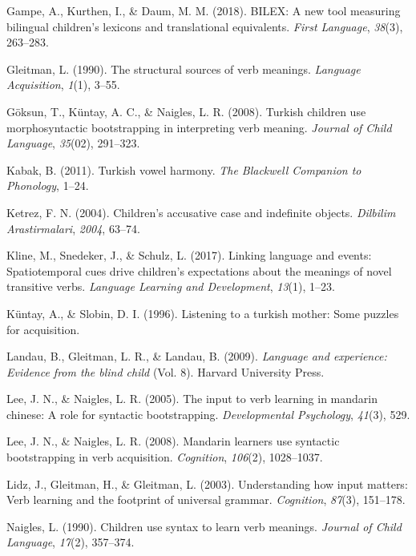 \documentclass[man]{apa6}
\begin{document}
\hypertarget{ref-gampe2018bilex}{}
Gampe, A., Kurthen, I., \& Daum, M. M. (2018). BILEX: A new tool
measuring bilingual children's lexicons and translational equivalents.
\emph{First Language}, \emph{38}(3), 263--283.

\hypertarget{ref-gleitman1990structural}{}
Gleitman, L. (1990). The structural sources of verb meanings.
\emph{Language Acquisition}, \emph{1}(1), 3--55.

\hypertarget{ref-Goksun_etal2008a}{}
Göksun, T., Küntay, A. C., \& Naigles, L. R. (2008). Turkish children
use morphosyntactic bootstrapping in interpreting verb meaning.
\emph{Journal of Child Language}, \emph{35}(02), 291--323.

\hypertarget{ref-kabak2011turkish}{}
Kabak, B. (2011). Turkish vowel harmony. \emph{The Blackwell Companion
to Phonology}, 1--24.

\hypertarget{ref-ketrez2004children}{}
Ketrez, F. N. (2004). Children's accusative case and indefinite objects.
\emph{Dilbilim Arastirmalari}, \emph{2004}, 63--74.

\hypertarget{ref-kline2017linking}{}
Kline, M., Snedeker, J., \& Schulz, L. (2017). Linking language and
events: Spatiotemporal cues drive children's expectations about the
meanings of novel transitive verbs. \emph{Language Learning and
Development}, \emph{13}(1), 1--23.

\hypertarget{ref-kuntay1996listening}{}
Küntay, A., \& Slobin, D. I. (1996). Listening to a turkish mother: Some
puzzles for acquisition.

\hypertarget{ref-landau2009language}{}
Landau, B., Gleitman, L. R., \& Landau, B. (2009). \emph{Language and
experience: Evidence from the blind child} (Vol. 8). Harvard University
Press.

\hypertarget{ref-lee2005input}{}
Lee, J. N., \& Naigles, L. R. (2005). The input to verb learning in
mandarin chinese: A role for syntactic bootstrapping.
\emph{Developmental Psychology}, \emph{41}(3), 529.

\hypertarget{ref-lee2008mandarin}{}
Lee, J. N., \& Naigles, L. R. (2008). Mandarin learners use syntactic
bootstrapping in verb acquisition. \emph{Cognition}, \emph{106}(2),
1028--1037.

\hypertarget{ref-lidz2003understanding}{}
Lidz, J., Gleitman, H., \& Gleitman, L. (2003). Understanding how input
matters: Verb learning and the footprint of universal grammar.
\emph{Cognition}, \emph{87}(3), 151--178.

\hypertarget{ref-naigles1990children}{}
Naigles, L. (1990). Children use syntax to learn verb meanings.
\emph{Journal of Child Language}, \emph{17}(2), 357--374.
\end{document}

